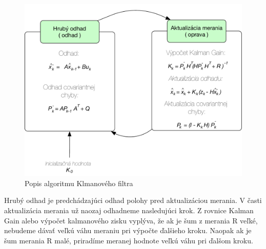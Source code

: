 \begin{figure}[H]
\begin{center}
	\includegraphics[scale=0.6]{obrazky/kalman}
	\caption{Popis algoritmu Klmanového filtra}
	\end{center}
\end{figure}

Hrubý odhad je predchádzajúci odhad polohy pred aktualizáciou merania. V časti aktualizácia merania už naozaj odhadneme nasledujúci krok. Z rovnice Kalman Gain alebo výpočet kalmanového zisku vyplýva, že ak je šum z merania R veľké, nebudeme dávať veľkú váhu meraniu pri výpočte ďalšieho kroku. Naopak ak je šum merania R malé, priradíme meranej hodnote veľkú váhu pri ďalšom kroku.  